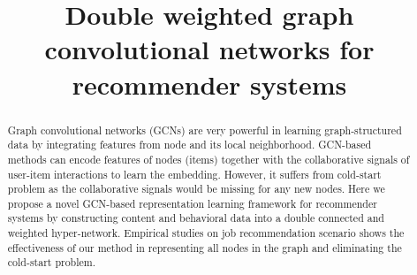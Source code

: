 \documentclass[manuscript,screen,review]{acmart}
\begin{document}
\title{Double weighted graph convolutional networks for recommender systems}

\iffalse
\author{Ben Trovato}
\authornote{Both authors contributed equally to this research.}
\email{trovato@corporation.com}
\orcid{1234-5678-9012}
\author{G.K.M. Tobin}
\authornotemark[1]
\email{webmaster@marysville-ohio.com}
\affiliation{%
  \institution{Institute for Clarity in Documentation}
  \streetaddress{P.O. Box 1212}
  \city{Dublin}
  \state{Ohio}
  \country{USA}
  \postcode{43017-6221}
}
\fi
\renewcommand{\shortauthors}{Trovato and Tobin, et al.}

\begin{abstract}

Graph convolutional networks (GCNs) are very powerful in learning graph-structured data by integrating features from node and its local neighborhood. GCN-based methods can encode features of nodes (items) together with the collaborative signals of user-item interactions to learn the embedding. However, it suffers from cold-start problem as the collaborative signals would be missing for any new nodes. Here we propose a novel GCN-based representation learning framework for recommender systems by constructing
content and behavioral data into a double connected and weighted hyper-network. Empirical studies on job recommendation scenario shows the effectiveness of our method in representing all nodes in the graph and eliminating the cold-start problem. 

\end{abstract}
\end{document}
